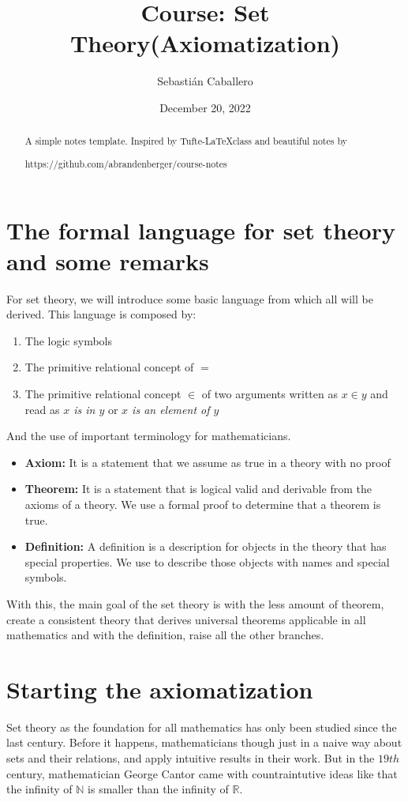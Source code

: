 \documentclass{tufte-handout}
\title{Course: Set Theory(Axiomatization)}
\author{Sebastián Caballero}
\date{December 20, 2022}
\begin{document}
\maketitle

\begin{abstract}
\noindent
A simple notes template. Inspired by Tufte-\LaTeX class and beautiful notes by \begin{verbatim*}
	https://github.com/abrandenberger/course-notes
\end{verbatim*}
\end{abstract}
\section{The formal language for set theory and some remarks}
For set theory, we will introduce some basic language from which all will be derived. This language is composed by:

\begin{enumerate}
	\item The logic symbols
	\item The primitive relational concept of $=$
	\item The primitive relational concept $\in$ of two arguments written as $x \in y$ and read as \textit{$x$ is in $y$} or \textit{$x$ is an element of $y$}
\end{enumerate}

And the use of important terminology for mathematicians.
\begin{itemize}
	\item \textbf{Axiom:} It is a statement that we assume as true in a theory with no proof
	\item \textbf{Theorem:} It is a statement that is logical valid and derivable from the axioms of a theory. We use a formal proof to determine that a theorem is true.
	\item \textbf{Definition:} A definition is a description for objects in the theory that has special properties. We use to describe those objects with names and special symbols.
\end{itemize}

With this, the main goal of the set theory is with the less amount of theorem, create a consistent theory that derives universal theorems applicable in all mathematics and with the definition, raise all the other branches. 

\section{Starting the axiomatization}
Set theory as the foundation for all mathematics has only been studied since the last century. Before it happens, mathematicians though just in a naive way about sets and their relations, and apply intuitive results in their work. But in the $19th$ century, mathematician George Cantor came with countraintutive ideas like that the infinity of $\mathbb{N}$ is smaller than the infinity of $\mathbb{R}$. \\
\end{document}
